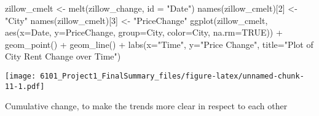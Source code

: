 \documentclass[
]{article}
\newenvironment{Shaded}{\begin{snugshade}}{\end{snugshade}}
\newcommand{\AttributeTok}[1]{\textcolor[rgb]{0.77,0.63,0.00}{#1}}
\newcommand{\ConstantTok}[1]{\textcolor[rgb]{0.00,0.00,0.00}{#1}}
\newcommand{\DecValTok}[1]{\textcolor[rgb]{0.00,0.00,0.81}{#1}}
\newcommand{\FunctionTok}[1]{\textcolor[rgb]{0.00,0.00,0.00}{#1}}
\newcommand{\NormalTok}[1]{#1}
\newcommand{\OtherTok}[1]{\textcolor[rgb]{0.56,0.35,0.01}{#1}}
\newcommand{\SpecialCharTok}[1]{\textcolor[rgb]{0.00,0.00,0.00}{#1}}
\newcommand{\StringTok}[1]{\textcolor[rgb]{0.31,0.60,0.02}{#1}}
\begin{document}
\begin{Shaded}
\begin{Highlighting}[]
\NormalTok{zillow\_cmelt }\OtherTok{\textless{}{-}} \FunctionTok{melt}\NormalTok{(zillow\_change, }\AttributeTok{id =} \StringTok{"Date"}\NormalTok{)}
\FunctionTok{names}\NormalTok{(zillow\_cmelt)[}\DecValTok{2}\NormalTok{] }\OtherTok{\textless{}{-}} \StringTok{"City"}
\FunctionTok{names}\NormalTok{(zillow\_cmelt)[}\DecValTok{3}\NormalTok{] }\OtherTok{\textless{}{-}} \StringTok{"PriceChange"}
\FunctionTok{ggplot}\NormalTok{(zillow\_cmelt, }\FunctionTok{aes}\NormalTok{(}\AttributeTok{x=}\NormalTok{Date, }\AttributeTok{y=}\NormalTok{PriceChange, }\AttributeTok{group=}\NormalTok{City, }\AttributeTok{color=}\NormalTok{City, }\AttributeTok{na.rm=}\ConstantTok{TRUE}\NormalTok{)) }\SpecialCharTok{+} \FunctionTok{geom\_point}\NormalTok{() }\SpecialCharTok{+} \FunctionTok{geom\_line}\NormalTok{() }\SpecialCharTok{+} \FunctionTok{labs}\NormalTok{(}\AttributeTok{x=}\StringTok{"Time"}\NormalTok{, }\AttributeTok{y=}\StringTok{"Price Change"}\NormalTok{, }\AttributeTok{title=}\StringTok{"Plot of City Rent Change over Time"}\NormalTok{)}
\end{Highlighting}
\end{Shaded}

\texttt{[image: 6101\_Project1\_FinalSummary\_files/figure-latex/unnamed-chunk-11-1.pdf]}

Cumulative change, to make the trends more clear in respect to each
other

\begin{Shaded}
\end{Shaded}
\end{document}
